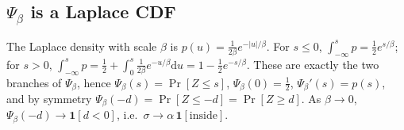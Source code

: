 \documentclass[11pt,a4paper]{article}
\begin{document}
\subsection{\texorpdfstring{$\Psi_\beta$}{Psi\_beta} is a Laplace CDF}\label{app:laplace}
The Laplace density with scale $\beta$ is $p(u)=\frac1{2\beta}e^{-|u|/\beta}$. For $s\le0$,
$\int_{-\infty}^s p=\frac12e^{s/\beta}$; for $s>0$, $\int_{-\infty}^sp=\frac12+\int_0^s\frac1{2\beta}e^{-u/\beta}\mathrm du=1-\frac12e^{-s/\beta}$.
These are exactly the two branches of $\Psi_\beta$, hence $\Psi_\beta(s)=\Pr[Z\le s]$, $\Psi_\beta(0)=\tfrac12$, $\Psi_\beta'(s)=p(s)$, and
by symmetry $\Psi_\beta(-d)=\Pr[Z\le-d]=\Pr[Z\ge d]$. As $\beta\to0$, $\Psi_\beta(-d)\to\mathbf 1[d<0]$, i.e.\ $\sigma\to\alpha\,\mathbf 1[\text{inside}]$.
\end{document}
